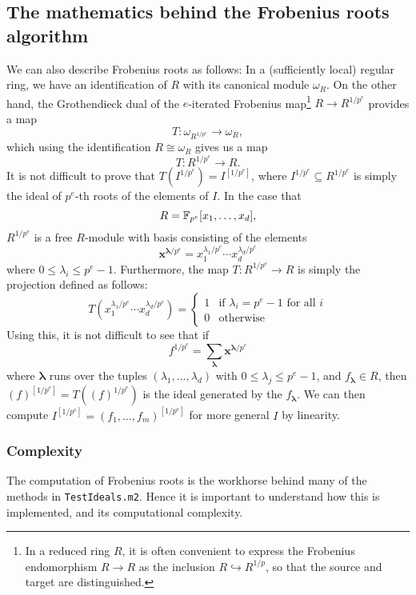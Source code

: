 \documentclass{amsart}
\begin{document}
\subsection{The mathematics behind the Frobenius roots algorithm}
\label{ss: math behind}

We can also describe Frobenius roots as follows:  In a (sufficiently local) regular ring, we have an identification of $R$ with its canonical module $\omega_R$.
On the other hand, the Grothendieck dual of the $e$-iterated Frobenius map\footnote{In a reduced ring $R$, it is often convenient to express the Frobenius endomorphism $R \to R$ as the inclusion $R \hookrightarrow R^{1/p}$, so that the source and target  are distinguished.} $R \to R^{1/p^e}$ provides a map
\begin{equation}
\label{eq.DualToFrobenius}
T : \omega_{R^{1/p^e}} \to \omega_R,
\end{equation}
which using the identification $R \cong \omega_R$ gives us a map
\[
T : R^{1/p^e} \to R.
\]
It is not difficult to prove that 
$T(I^{1/p^e})=I^{[1/p^e]}$,
where $I^{1/p^e} \subseteq R^{1/p^e}$ is simply the ideal of $p^e$-th roots of the elements of $I$.
In the case that
\[
R = \mathbb{F}_{p^e}[x_1, \ldots, x_d],
\]
$R^{1/p^e}$ is a free $R$-module with basis consisting of the elements
\[
\mathbf{x}^{\boldsymbol{\lambda}/p^e}= x_1^{\lambda_1/p^e} \cdots x_d^{\lambda_d/p^e}
\]
where $0 \leq \lambda_i \leq p^e-1$.
Furthermore, the map $T : R^{1/p^e} \to R$ is simply the projection defined as follows:
\[
T(x_1^{\lambda_1/p^e} \cdots x_d^{\lambda_d/p^e}) = \left\{ \begin{array}{rl} 1 &\text{if } \lambda_i = p^{e}-1 \text{ for all }i \\ 0 & \text{otherwise}  \end{array} \right.
\]
Using this, it is not difficult to see that if
\begin{equation}
\label{eqn1}
f^{1/p^e} = \sum_{\boldsymbol{\lambda}} \mathbf{x}^{\boldsymbol{\lambda} / p^e}
\end{equation}
where $\boldsymbol{\lambda}$ runs over the tuples $(\lambda_1, \dots, \lambda_d)$ with $0 \leq \lambda_j \leq p^e-1$, and $f_{\boldsymbol{\lambda}} \in R$, then
$(f)^{[1/p^e]} = T( (f)^{1/p^e})$ is the ideal generated by the $f_{\boldsymbol{\lambda}}$.
We can then compute $I^{[1/p^e]} = (f_1, \dots, f_m)^{[1/p^e]}$ for more general $I$ by linearity.

\subsubsection{Complexity}
The computation of Frobenius roots is the workhorse behind many of the methods in \texttt{TestIdeals.m2}.
Hence it is important to understand how this is implemented, and its computational complexity.
\end{document}
